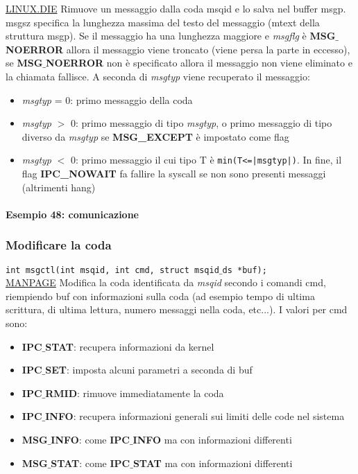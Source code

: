         \href{https://linux.die.net/man/2/msgsnd}{LINUX.DIE} Rimuove un messaggio dalla coda msqid e lo salva nel buffer msgp. msgsz specifica la lunghezza  massima  del  testo  del  messaggio  (mtext  della  struttura msgp).  Se  il messaggio  ha  una  lunghezza  maggiore  e  \textit{msgflg}  è  \textbf{MSG$\_$NOERROR}  allora  il messaggio viene troncato (viene persa la parte in eccesso), se \textbf{MSG$\_$NOERROR} non è specificato allora il messaggio non viene eliminato e la chiamata fallisce. A seconda di \textit{msgtyp} viene recuperato il messaggio:
        \begin{itemize}
            \item \textit{msgtyp} = 0: primo messaggio della coda
            \item \textit{msgtyp} $>$ 0: primo messaggio di tipo \textit{msgtyp}, o primo messaggio di tipo diverso da \textit{msgtyp} se \textbf{MSG\_EXCEPT} è impostato come flag
            \item \textit{msgtyp} $<$ 0: primo messaggio il cui tipo T è \texttt{min(T<=|msgtyp|)}. In fine, il flag \textbf{IPC\_NOWAIT} fa fallire la syscall se non sono presenti messaggi (altrimenti hang)
        \end{itemize}

            \paragraph{Esempio 48: comunicazione}\hfill \break
        
        \subsubsection{Modificare la coda}
        \texttt{int msgctl(int msqid, int cmd, struct msqid$\_$ds *buf);}\\
        
        \href{https://man7.org/linux/man-pages/man2/msgctl.2.html}{MANPAGE} Modifica la coda identificata da \textit{msqid} secondo i comandi cmd, riempiendo buf con informazioni  sulla  coda  (ad  esempio  tempo  di  ultima  scrittura,  di  ultima  lettura, numero messaggi nella coda, etc...). I valori per cmd sono:
        \begin{itemize}
            \item \textbf{IPC$\_$STAT}: recupera informazioni da kernel
            \item \textbf{IPC$\_$SET}: imposta alcuni parametri a seconda di buf
            \item \textbf{IPC$\_$RMID}: rimuove immediatamente la coda
            \item \textbf{IPC$\_$INFO}: recupera informazioni generali sui limiti delle code nel sistema
            \item \textbf{MSG$\_$INFO}: come \textbf{IPC$\_$INFO} ma con informazioni differenti
            \item \textbf{MSG$\_$STAT}: come \textbf{IPC$\_$STAT} ma con informazioni differenti
        
        \end{itemize}

